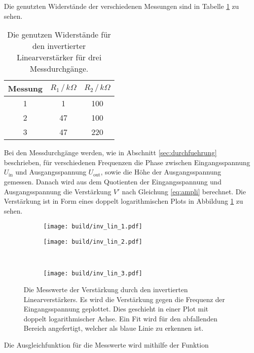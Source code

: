 Die genutzten Widerstände der verschiedenen Messungen sind in Tabelle \ref{tab:wider_inv_lin} zu sehen.
\begin{table}
    \centering
    \begin{tabular}{ccc}
        \toprule
        Messung & $R_1 \, / \, k\Omega $ & $R_2 \, / \,  k\Omega $ \\
        \midrule 
        1 & 1 & 100 \\
        2 & 47 & 100 \\
        3 & 47 & 220 \\
        \bottomrule
    \end{tabular}
    \caption{Die genutzen Widerstände für den invertierter Linearverstärker für drei Messdurchgänge.}
    \label{tab:wider_inv_lin}
\end{table}
Bei den Messdurchgänge werden, wie in Abschnitt \ref{sec:durchfuehrung} beschrieben, für verschiedenen Frequenzen die Phase zwischen Eingangsspannung $U_\text{in}$ und Ausgangsspannung $U_\text{out}$, sowie die Höhe der Ausgangsspannung gemessen.
Danach wird aus dem Quotienten der Eingangsspannung und Ausgangsspannung die Verstärkung $V'$ nach Gleichung \ref{eq:ampli} berechnet.
Die Verstärkung ist in Form eines doppelt logarithmischen Plots in Abbildung \ref{fig:inv_lin} zu sehen.
\begin{figure}
    \centering
    \begin{subfigure}{0.49\linewidth}%
        \texttt{[image: build/inv\_lin\_1.pdf]}
    \end{subfigure}
    \hfill
    \begin{subfigure}{0.49\linewidth}%
        \texttt{[image: build/inv\_lin\_2.pdf]}
    \end{subfigure}\\
    \begin{subfigure}{0.49\linewidth}%
        \texttt{[image: build/inv\_lin\_3.pdf]}
    \end{subfigure}
    \caption{Die Messwerte der Verstärkung durch den invertierten Linearverstärkers. Es wird die Verstärkung gegen die Frequenz der Eingangsspannung geplottet.
    Dies geschieht in einer Plot mit doppelt logarithmischer Achse. Ein Fit wird für den abfallenden Bereich angefertigt, welcher als blaue Linie zu erkennen ist.}
    \label{fig:inv_lin}
\end{figure}
Die Ausgleichfunktion für die Messwerte wird mithilfe der Funktion
